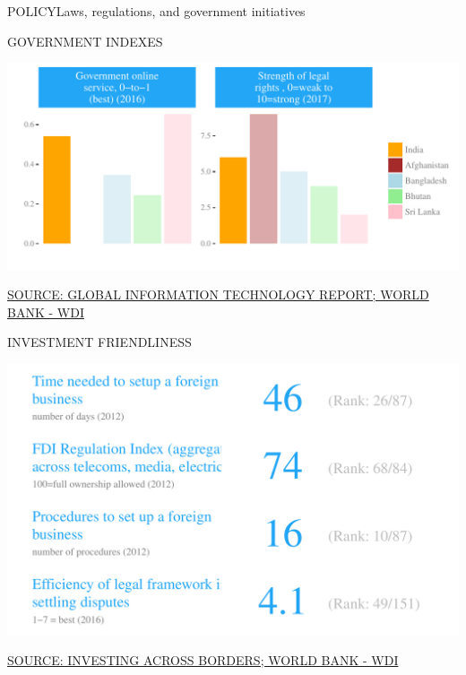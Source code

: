 \documentclass{article}\usepackage[]{graphicx}\usepackage[]{color}
\makeatletter
\def\maxwidth{ %
  \ifdim\Gin@nat@width>\linewidth
    \linewidth
  \else
    \Gin@nat@width
  \fi
}
\makeatother
\begin{document}
\begin{minipage}[c]{0.95\textwidth}
  \begin{flushleft}  
    \hspace{4ex}\Large{\textcolor[HTML]{22A6F5}{POLICY}}\hspace{2ex}\small{\textcolor[HTML]{818181}{Laws, regulations, and government initiatives}}
  \end{flushleft}
  \begin{minipage}[c]{0.55\textwidth}
    \hspace{4ex}\small{\textcolor[HTML]{818181}{GOVERNMENT INDEXES}}
    \vspace{1ex}


\hfill{}\includegraphics[width=\maxwidth]{figure/bar_facewrap_chart_Policy-1} 



   \hspace{4ex}\scriptsize{\href{NA}{\textcolor[HTML]{22A6F5}{SOURCE: GLOBAL INFORMATION TECHNOLOGY REPORT; WORLD BANK - WDI}}}
  \end{minipage}
  \begin{minipage}[c]{0.43\textwidth}
    \small{\textcolor[HTML]{818181}{INVESTMENT FRIENDLINESS}}
    \vspace{1ex}


{\centering \includegraphics[width=\maxwidth]{figure/number_chart_Policy-1} 

}



    \vspace{-1ex}
    \scriptsize{\href{NA}{\textcolor[HTML]{22A6F5}{SOURCE: INVESTING ACROSS BORDERS; WORLD BANK - WDI}}}
  \end{minipage}
\end{minipage}
\end{document}
